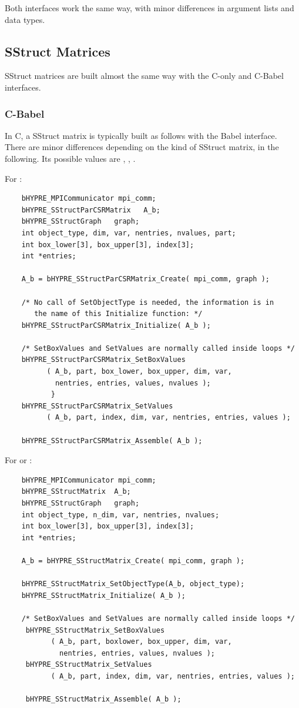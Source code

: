 Both interfaces work the same way, with minor differences in argument
lists and data types.

\subsection{SStruct Matrices}

SStruct matrices are built almost the same way with
the C-only and C-Babel interfaces.

\subsubsection{C-Babel}

In C, a SStruct  matrix is typically built as follows with
the Babel interface.  There are minor differences depending on the
kind of SStruct matrix,  in the following.  Its possible
values are , , .

For :
\begin{verbatim}
    bHYPRE_MPICommunicator mpi_comm;
    bHYPRE_SStructParCSRMatrix   A_b;
    bHYPRE_SStructGraph   graph;
    int object_type, dim, var, nentries, nvalues, part;
    int box_lower[3], box_upper[3], index[3];
    int *entries;

    A_b = bHYPRE_SStructParCSRMatrix_Create( mpi_comm, graph );

    /* No call of SetObjectType is needed, the information is in
       the name of this Initialize function: */
    bHYPRE_SStructParCSRMatrix_Initialize( A_b );

    /* SetBoxValues and SetValues are normally called inside loops */
    bHYPRE_SStructParCSRMatrix_SetBoxValues
          ( A_b, part, box_lower, box_upper, dim, var,
            nentries, entries, values, nvalues );
           }
    bHYPRE_SStructParCSRMatrix_SetValues
          ( A_b, part, index, dim, var, nentries, entries, values );

    bHYPRE_SStructParCSRMatrix_Assemble( A_b );
\end{verbatim}


For  or :
\begin{verbatim}
    bHYPRE_MPICommunicator mpi_comm;
    bHYPRE_SStructMatrix  A_b;
    bHYPRE_SStructGraph   graph;
    int object_type, n_dim, var, nentries, nvalues;
    int box_lower[3], box_upper[3], index[3];
    int *entries;

    A_b = bHYPRE_SStructMatrix_Create( mpi_comm, graph );

    bHYPRE_SStructMatrix_SetObjectType(A_b, object_type);
    bHYPRE_SStructMatrix_Initialize( A_b );

    /* SetBoxValues and SetValues are normally called inside loops */
     bHYPRE_SStructMatrix_SetBoxValues
           ( A_b, part, boxlower, box_upper, dim, var,
             nentries, entries, values, nvalues );
     bHYPRE_SStructMatrix_SetValues
           ( A_b, part, index, dim, var, nentries, entries, values );

     bHYPRE_SStructMatrix_Assemble( A_b );
\end{verbatim}

